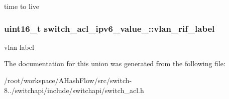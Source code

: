 time to live \hypertarget{unionswitch__acl__ipv6__value___add994f866b937fc043a2b575c106115c}{
\subsubsection[{vlan\+\_\+rif\+\_\+label}]{\setlength{\rightskip}{0pt plus 5cm}uint16\+\_\+t switch\+\_\+acl\+\_\+ipv6\+\_\+value\+\_\+\+::vlan\+\_\+rif\+\_\+label}}\label{unionswitch__acl__ipv6__value___add994f866b937fc043a2b575c106115c}
vlan label 

The documentation for this union was generated from the following file\+:\begin{DoxyCompactItemize}
\item 
/root/workspace/\+A\+Hash\+Flow/src/switch-\/8../switchapi/include/switchapi/switch\+\_\+acl.\+h\end{DoxyCompactItemize}
